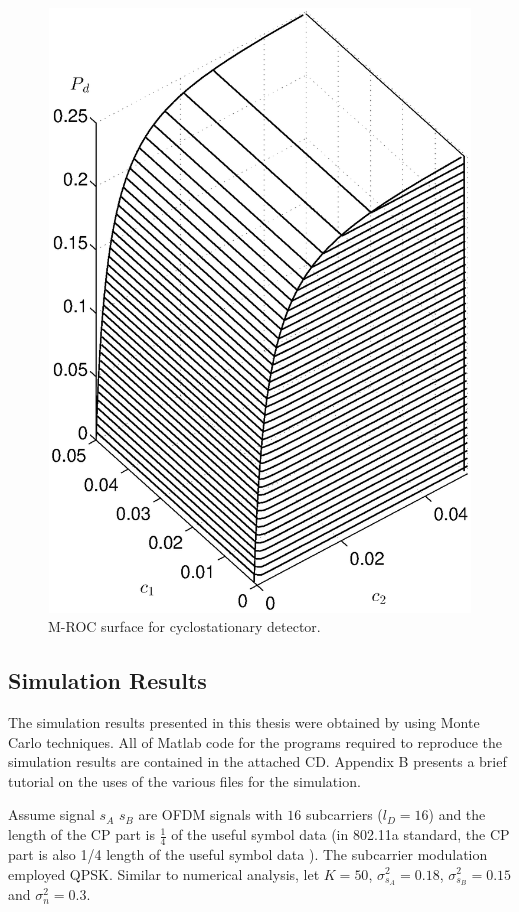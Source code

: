 \begin{figure}[!t]
  \centering 
  \includegraphics[width=12cm, height=16cm]{4/ROCsurface.eps}
  \caption{M-ROC surface for cyclostationary detector.}
  \label{pic:1221n0}
\end{figure}

\subsection{Simulation Results}
The simulation results presented in this thesis were obtained by using Monte Carlo techniques. All of Matlab code for the programs required to reproduce the simulation results are contained in the attached CD. Appendix B presents a brief tutorial on the uses of the various files for the simulation.

Assume signal $s_A$ $s_B$ are OFDM signals with $16$ subcarriers ($l_D = 16$) and the length of the CP part is $\frac{1}{4}$ of the useful symbol data (in 802.11a standard, the CP part is also 1/4 length of the useful symbol data  \cite{1000232}). 
The subcarrier modulation employed QPSK. Similar to numerical analysis, let $K=50$, $\sigma_{s_A}^2 = 0.18$, $\sigma_{s_B}^2 = 0.15$ and $\sigma_{n}^2 = 0.3$. 
  
